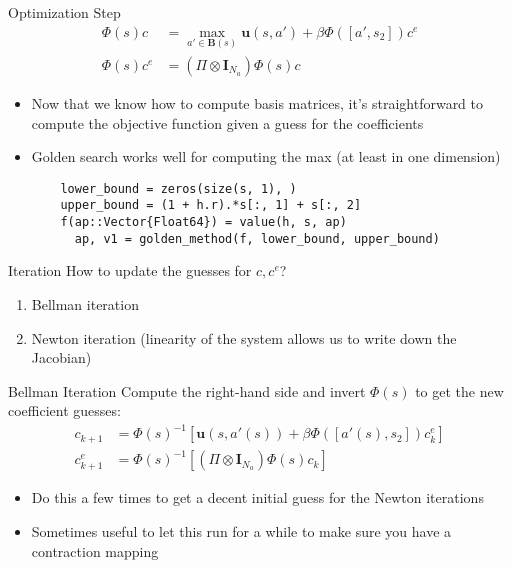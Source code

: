 \documentclass{beamer}
\begin{document}
\begin{frame}[fragile]{Optimization Step}
\begin{align*}
\Phi(s)c &= \max_{a' \in \mathbf{B}(s)} \mathbf{u}(s, a') + \beta \Phi([a', s_2]) c^e \\
\Phi(s)c^e &= (\Pi \otimes \mathbf{I}_{N_a}) \Phi (s) c
\end{align*}
\vspace{-8mm}
\begin{itemize}
\item Now that we know how to compute basis matrices, it's straightforward to compute the objective function given a guess for the coefficients
\item Golden search works well for computing the max (at least in one dimension)
\begin{verbatim}
    lower_bound = zeros(size(s, 1), )
    upper_bound = (1 + h.r).*s[:, 1] + s[:, 2]
    f(ap::Vector{Float64}) = value(h, s, ap)
      ap, v1 = golden_method(f, lower_bound, upper_bound)
\end{verbatim}
\end{itemize}
\end{frame}

\begin{frame}[fragile]{Iteration}
How to update the guesses for $c, c^e$?
\begin{enumerate}
\item Bellman iteration
\item Newton iteration (linearity of the system allows us to write down the Jacobian)
\end{enumerate}
\end{frame}

\begin{frame}{Bellman Iteration}
Compute the right-hand side and invert $\Phi(s)$ to get the new coefficient guesses:
\begin{align*}
c_{k+1} &= \Phi(s)^{-1} \left[\mathbf{u}(s, a'(s)) + \beta \Phi([a'(s), s_2]) c^e_k \right] \\
c^e_{k+1} &= \Phi(s)^{-1} \left[ (\Pi \otimes \mathbf{I}_{N_a}) \Phi (s) c_k \right]
\end{align*}
\vspace{-8mm}
\begin{itemize}
\item Do this a few times to get a decent initial guess for the Newton iterations
\item Sometimes useful to let this run for a while to make sure you have a contraction mapping
\end{itemize}
\end{frame}
\end{document}
